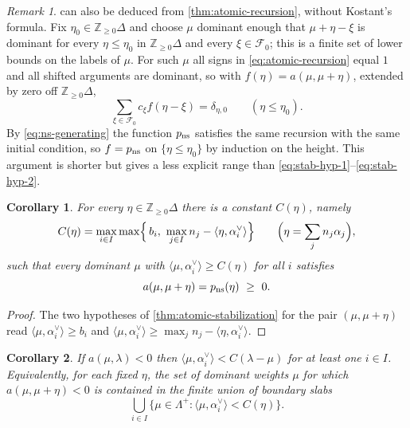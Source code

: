 \documentclass[11pt]{article}
\newtheorem{corollary}[corollary]{Corollary}
\theoremstyle{definition}
\theoremstyle{remark}
\newtheorem{remark}[remark]{Remark}
\newcommand{\RaizSimp}{\Delta}
\newcommand{\Pesos}{\Lambda}
\newcommand{\Z}{\mathbb Z}
\begin{document}
\begin{remark}\label{rem:stabilization-second-proof}
 can also be deduced from
\cref{thm:atomic-recursion}, without Kostant's formula.  Fix
$\eta_0\in\Z_{\ge0}\RaizSimp$ and choose $\mu$ dominant enough that
$\mu+\eta-\xi$ is dominant for every $\eta\le\eta_0$ in
$\Z_{\ge0}\RaizSimp$ and every $\xi\in\mathcal F_0$; this is a finite set of
lower bounds on the labels of $\mu$.  For such $\mu$ all signs in
\eqref{eq:atomic-recursion} equal $1$ and all shifted arguments are dominant,
so with $f(\eta)=a(\mu,\mu+\eta)$, extended by zero off
$\Z_{\ge0}\RaizSimp$,
\[
   \sum_{\xi\in\mathcal F_0}c_\xi f(\eta-\xi)=\delta_{\eta,0}
   \qquad(\eta\le\eta_0).
\]
By \eqref{eq:ns-generating} the function $p_{\rm ns}$ satisfies the same
recursion with the same initial condition, so $f=p_{\rm ns}$ on
$\{\eta\le\eta_0\}$ by induction on the height.  This argument is shorter but
gives a less explicit range than \eqref{eq:stab-hyp-1}--\eqref{eq:stab-hyp-2}.
\end{remark}

\begin{corollary}
\label{cor:eventual-positivity}
For every $\eta\in\Z_{\ge0}\RaizSimp$ there is a constant $C(\eta)$, namely
\[
   C(\eta)=\max_{i\in I}
     \max\Bigl\{\,b_i,\ \max_{j\in I}n_j-\langle\eta,\alpha_i^\vee\rangle\Bigr\}
   \qquad\Bigl(\eta=\sum_j n_j\alpha_j\Bigr),
\]
such that every dominant $\mu$ with $\langle\mu,\alpha_i^\vee\rangle\ge C(\eta)$
for all $i$ satisfies
\[
   a(\mu,\mu+\eta)=p_{\rm ns}(\eta)\ \ge\ 0 .
\]
\end{corollary}

\begin{proof}
The two hypotheses of \cref{thm:atomic-stabilization} for the pair
$(\mu,\mu+\eta)$ read $\langle\mu,\alpha_i^\vee\rangle\ge b_i$ and
$\langle\mu,\alpha_i^\vee\rangle\ge\max_j n_j-\langle\eta,\alpha_i^\vee\rangle$.
\end{proof}

\begin{corollary}
\label{cor:negativity-is-shallow}
If $a(\mu,\lambda)<0$ then
$\langle\mu,\alpha_i^\vee\rangle<C(\lambda-\mu)$ for at least one $i\in I$.
Equivalently, for each fixed $\eta$, the set of dominant weights $\mu$ for
which $a(\mu,\mu+\eta)<0$ is contained in the finite union of boundary slabs
\[
   \bigcup_{i\in I}
   \{\mu\in\Pesos^+:\langle\mu,\alpha_i^\vee\rangle<C(\eta)\}.
\]
\end{corollary}
\end{document}
